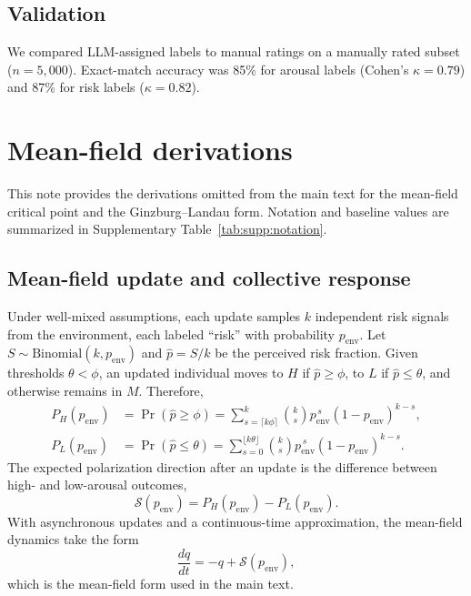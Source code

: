 \documentclass[11pt]{article}
\begin{document}
\subsection{Validation}
We compared LLM-assigned labels to manual ratings on a manually rated subset ($n=5{,}000$). Exact-match accuracy was 85\% for arousal labels (Cohen's $\kappa=0.79$) and 87\% for risk labels ($\kappa=0.82$).

\section{Mean-field derivations}
\label{supp:s2-mean-field}

This note provides the derivations omitted from the main text for the mean-field critical point and the Ginzburg--Landau form.
\noindent Notation and baseline values are summarized in Supplementary Table~\ref{tab:supp:notation}.

\subsection{Mean-field update and collective response}

Under well-mixed assumptions, each update samples $k$ independent risk signals from the environment, each labeled ``risk'' with probability $p_{\text{env}}$. Let $S\sim\text{Binomial}(k,p_{\text{env}})$ and $\hat{p}=S/k$ be the perceived risk fraction. Given thresholds $\theta<\phi$, an updated individual moves to $H$ if $\hat{p}\ge \phi$, to $L$ if $\hat{p}\le \theta$, and otherwise remains in $M$. Therefore,
\begin{align}
P_H(p_{\text{env}}) &= \Pr(\hat{p}\ge \phi)=\sum_{s=\lceil k\phi\rceil}^{k}\binom{k}{s}p_{\text{env}}^{\,s}(1-p_{\text{env}})^{k-s},\\
P_L(p_{\text{env}}) &= \Pr(\hat{p}\le \theta)=\sum_{s=0}^{\lfloor k\theta\rfloor}\binom{k}{s}p_{\text{env}}^{\,s}(1-p_{\text{env}})^{k-s}.
\end{align}
The expected polarization direction after an update is the difference between high- and low-arousal outcomes,
\begin{equation}
\mathcal{S}(p_{\text{env}})=P_H(p_{\text{env}})-P_L(p_{\text{env}}).
\end{equation}
With asynchronous updates and a continuous-time approximation, the mean-field dynamics take the form
\begin{equation}
\frac{dq}{dt}=-q+\mathcal{S}(p_{\text{env}}),
\end{equation}
which is the mean-field form used in the main text.
\end{document}
